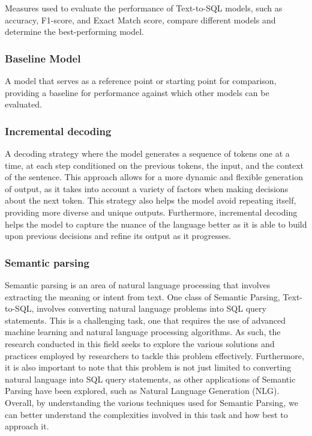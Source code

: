 Measures used to evaluate the performance of Text-to-SQL models, such as accuracy, F1-score, and Exact Match score, compare different models and determine the best-performing model.

\subsubsection{Baseline Model}

A model that serves as a reference point or starting point for comparison, providing a baseline for performance against which other models can be evaluated.

\subsubsection{Incremental decoding}

A decoding strategy where the model generates a sequence of tokens one at a time, at each step conditioned on the previous tokens, the input, and the context of the sentence. This approach allows for a more dynamic and flexible generation of output, as it takes into account a variety of factors when making decisions about the next token. This strategy also helps the model avoid repeating itself, providing more diverse and unique outputs. Furthermore, incremental decoding helps the model to capture the nuance of the language better as it is able to build upon previous decisions and refine its output as it progresses\cite{huang-mi-2010-efficient}.

\subsubsection{Semantic parsing}

Semantic parsing\cite{krishnamurthy-etal-2017-neural} is an area of natural language processing that involves extracting the meaning or intent from text. One class of Semantic Parsing, Text-to-SQL, involves converting natural language problems into SQL query statements. This is a challenging task, one that requires the use of advanced machine learning and natural language processing algorithms. As such, the research conducted in this field seeks to explore the various solutions and practices employed by researchers to tackle this problem effectively. Furthermore, it is also important to note that this problem is not just limited to converting natural language into SQL query statements, as other applications of Semantic Parsing have been explored, such as Natural Language Generation (NLG). Overall, by understanding the various techniques used for Semantic Parsing, we can better understand the complexities involved in this task and how best to approach it.

